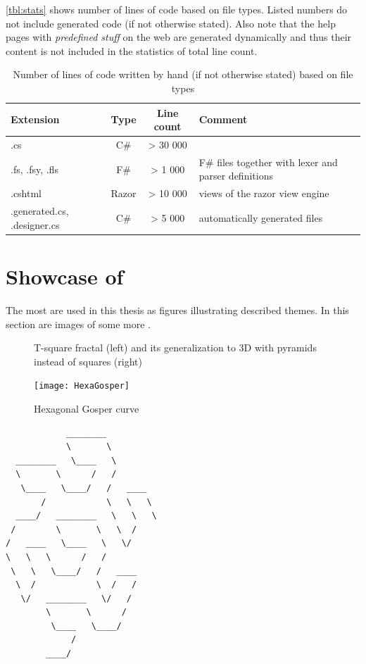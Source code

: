 \autoref{tbl:stats} shows number of lines of code based on file types.
Listed numbers do not include generated code (if not otherwise stated).
Also note that the help pages with \emph{predefined stuff} on the web are generated dynamically and thus their content is not included in the statistics of total line count.


\begin{table}[H]
	\centering
	\begin{tabular}{p{65pt} c c p{200pt}}
   		\toprule
   		Extension & Type & Line count & Comment\\
   		\midrule
		.cs & C\# & > 30 000 &  \\ \hline
		.fs, .fsy, .fls & F\# & > 1 000 & F\# files together with lexer and parser definitions \\ \hline
		.cshtml & Razor & > 10 000 & views of the razor view engine\\ \hline
		.generated.cs, .designer.cs & C\# & > 5 000 & automatically generated files \\
		\bottomrule
	\end{tabular}
	\caption{Number of lines of code written by hand (if not otherwise stated) based on file types}
	\label{tbl:stats}
\end{table}



\section{Showcase of \lsystems}

The most \lsystems are used in this thesis as figures illustrating described themes.
In this section are images of some more \lsystems.

\begin{figure}[H]
	\hfill
	\caption{T-square fractal (left) and its generalization to 3D with pyramids instead of squares (right)}
	\label{fig:rsltTsquares}
\end{figure}

\begin{figure}[p]
	\centering
	\texttt{[image: HexaGosper]}
	\caption{Hexagonal Gosper curve}
	\label{fig:rsltHexaGosper}
\end{figure}

\newsavebox{\lstBoxGosper}
\begin{lrbox}{\lstBoxGosper}
\consolas
\footnotesize
\begin{lstlisting}
            ________          
            \       \         
  ________   \____   \        
  \       \      /   /        
   \____   \____/   /   ____  
       /            \   \   \ 
  ____/   ________   \   \   \
 /        \       \   \  /    
/   ____   \____   \   \/     
\   \   \      /   /          
 \   \   \____/   /   ____    
  \  /            \  /   /    
   \/   ________   \/   /     
        \       \      /      
         \____   \____/       
             /                
        ____/                 
\end{lstlisting}
\end{lrbox}

